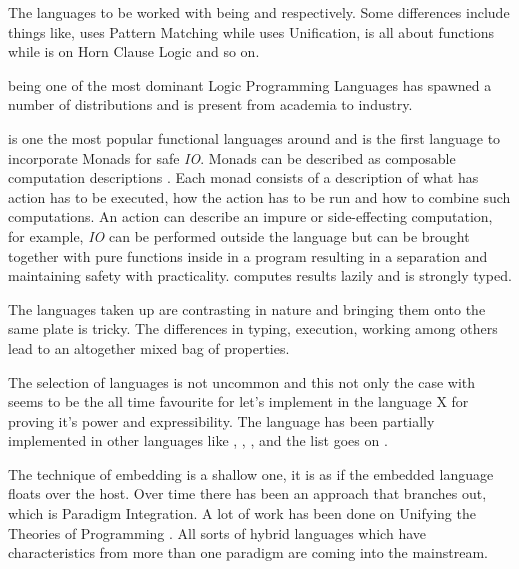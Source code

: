 \documentclass[thesis-solanki.tex]{subfiles}
\begin{document}
The languages to be worked with being  and  respectively.
Some differences include things like,  uses Pattern Matching while  uses
Unification,  is all about functions while  is on Horn Clause Logic and so
on.

 \cite{wikiprolog} being one of the most dominant Logic Programming Languages has 
spawned a number of distributions and is present from academia to industry.  

 is one the most popular \cite{website:langpop} functional languages around and is the 
first language to incorporate Monads \cite{wadler1992comprehending} for safe \textit{IO}. Monads can be 
described as composable computation descriptions \cite{website:monadshaskellorg} . Each monad consists of a 
description of what has action has to be executed, how the action has to be run and how to combine such 
computations. An action can describe an impure or side-effecting computation, for example, \textit{IO} can be 
performed outside the language but can be brought together with pure functions inside in a program resulting in a 
separation and maintaining safety with practicality.  computes results lazily and is strongly 
typed. 

The languages taken up are contrasting in nature and bringing them onto the same plate is tricky. The 
differences in typing, execution, working among others lead to an altogether mixed bag of properties.

The selection of languages is not uncommon and this not only the case with  seems 
to be the all time favourite for let's implement  in the language X for proving it's power and 
expressibility. The  language has been partially implemented \cite{swipembedd} in other 
languages like  \cite{racklog},   
\cite{komorowski1982qlog,robinson1982loglisp,robinson1980loglisp},  \cite{wikiprolog, jlog}, 
 \cite{jscriptlog} and the list \cite{yieldprolog} goes on .    

The technique of embedding is a shallow one,
it is as if the embedded language floats over the host.
Over time there has been an approach that branches out, which is Paradigm Integration.
A lot of work has been done on Unifying the Theories of Programming
\cite{DBLP:conf/utp/2006,DBLP:conf/utp/2008,DBLP:conf/utp/2010,DBLP:conf/utp/2012,hoare1998unifying,
  gibbons2013unifying}.
All sorts of hybrid languages which have characteristics from more than one paradigm are coming into the
mainstream.
\end{document}
